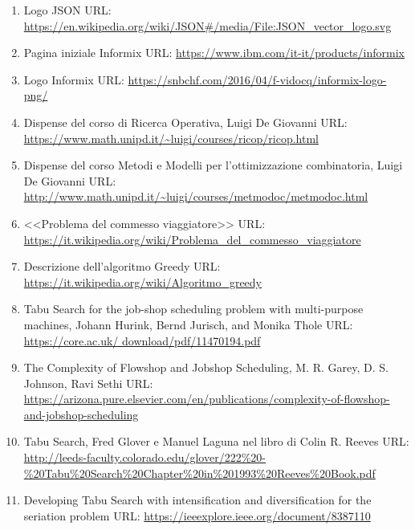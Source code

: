 \begin{enumerate}
    \item \label{jlogo} Logo JSON URL: \url{https://en.wikipedia.org/wiki/JSON#/media/File:JSON_vector_logo.svg}
    
    \item \label{informix} Pagina iniziale Informix URL: \url{https://www.ibm.com/it-it/products/informix}
    
    \item \label{ilogo} Logo Informix URL: \url{https://snbchf.com/2016/04/f-vidocq/informix-logo-png/}
    
    \item \label{slide0} Dispense del corso di Ricerca Operativa, Luigi De Giovanni URL:
     \url{https://www.math.unipd.it/~luigi/courses/ricop/ricop.html}
    
    \item \label{slide} Dispense del corso Metodi e Modelli per l'ottimizzazione combinatoria, Luigi De Giovanni URL:
     \url{http://www.math.unipd.it/~luigi/courses/metmodoc/metmodoc.html}

    \item \label{commesso} <<Problema del commesso viaggiatore>> URL: \url{https://it.wikipedia.org/wiki/Problema_del_commesso_viaggiatore}
    
    \item \label{greedy} Descrizione dell'algoritmo Greedy URL: \url{https://it.wikipedia.org/wiki/Algoritmo_greedy}
    
    \item \label{tabu} Tabu Search for the job-shop scheduling problem with multi-purpose machines,
    Johann Hurink, Bernd Jurisch, and Monika Thole URL: \url{https://core.ac.uk/
    download/pdf/11470194.pdf}

    \item \label{scheduling} The Complexity of Flowshop and Jobshop Scheduling, M. R. Garey, D. S. Johnson,
    Ravi Sethi URL: \url{https://arizona.pure.elsevier.com/en/publications/complexity-of-flowshop-and-jobshop-scheduling}

    \item \label{list} Tabu Search, Fred Glover e Manuel Laguna nel libro di Colin R. Reeves URL:  
    \url{http://leeds-faculty.colorado.edu/glover/222%20-%20Tabu%20Search%20Chapter%20in%201993%20Reeves%20Book.pdf}

    \item \label{criteria} Developing Tabu Search with intensification and diversification for the seriation problem URL: 
    \url{https://ieeexplore.ieee.org/document/8387110}

\end{enumerate}